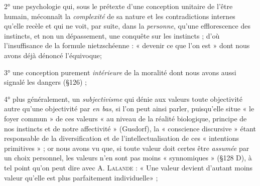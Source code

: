 2° une psychologie qui, sous le prétexte d’une conception unitaire
de l’être humain, méconnaît la {\it complexité} de sa nature et les contradictions
internes qu’elle recèle et qui ne voit, par suite, dans la
{\it personne}, qu’une efflorescence des instincts, et non un dépassement,
une conquête sur les instincts ; d’où l’insuffisance de la formule
nietzschéenne : « devenir ce que l’on est » dont nous avons déjà
dénoncé l’équivoque;

3° une conception purement {\it intérieure} de la moralité dont nous
avons aussi signalé les dangers (\S 126) ;

4° plus généralement, un {\it subjectivisme} qui dénie aux valeurs toute
objectivité autre qu’une objectivité par {\it en bas}, si l’on peut ainsi parler,
puisqu’elle situe « le foyer commun » de ces valeurs « au niveau
de la réalité biologique, principe de nos instincts et de notre affectivité »
(Gusdorf), la « conscience discursive » étant responsable de
la diversification et de l’intellectualisation de ces « intentions primitives » ;
or nous avons vu que, si toute valeur doit certes être {\it assumée}
par un choix personnel, les valeurs n’en sont pas moins « synnomiques »
(\S 128 D), à tel point qu’on peut dire avec A. \textsc{Lalande} :
« Une valeur devient d’autant moins valeur qu’elle est plus parfaitement
individuelle» ;

